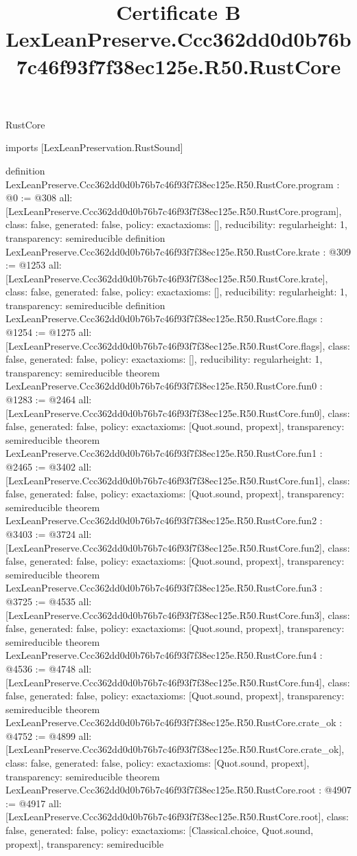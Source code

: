 \begin{lexlean}{RustCore}
\title{Certificate B LexLeanPreserve.Ccc362dd0d0b76b7c46f93f7f38ec125e.R50.RustCore}
\begin{coremodule}
imports [LexLeanPreservation.RustSound]

definition LexLeanPreserve.Ccc362dd0d0b76b7c46f93f7f38ec125e.R50.RustCore.program : @0 := @308 {
  all: [LexLeanPreserve.Ccc362dd0d0b76b7c46f93f7f38ec125e.R50.RustCore.program],
  class: false,
  generated: false,
  policy: exact{axioms: []},
  reducibility: regular{height: 1},
  transparency: semireducible
}
definition LexLeanPreserve.Ccc362dd0d0b76b7c46f93f7f38ec125e.R50.RustCore.krate : @309 := @1253 {
  all: [LexLeanPreserve.Ccc362dd0d0b76b7c46f93f7f38ec125e.R50.RustCore.krate],
  class: false,
  generated: false,
  policy: exact{axioms: []},
  reducibility: regular{height: 1},
  transparency: semireducible
}
definition LexLeanPreserve.Ccc362dd0d0b76b7c46f93f7f38ec125e.R50.RustCore.flags : @1254 := @1275 {
  all: [LexLeanPreserve.Ccc362dd0d0b76b7c46f93f7f38ec125e.R50.RustCore.flags],
  class: false,
  generated: false,
  policy: exact{axioms: []},
  reducibility: regular{height: 1},
  transparency: semireducible
}
theorem LexLeanPreserve.Ccc362dd0d0b76b7c46f93f7f38ec125e.R50.RustCore.fun0 : @1283 := @2464 {
  all: [LexLeanPreserve.Ccc362dd0d0b76b7c46f93f7f38ec125e.R50.RustCore.fun0],
  class: false,
  generated: false,
  policy: exact{axioms: [Quot.sound, propext]},
  transparency: semireducible
}
theorem LexLeanPreserve.Ccc362dd0d0b76b7c46f93f7f38ec125e.R50.RustCore.fun1 : @2465 := @3402 {
  all: [LexLeanPreserve.Ccc362dd0d0b76b7c46f93f7f38ec125e.R50.RustCore.fun1],
  class: false,
  generated: false,
  policy: exact{axioms: [Quot.sound, propext]},
  transparency: semireducible
}
theorem LexLeanPreserve.Ccc362dd0d0b76b7c46f93f7f38ec125e.R50.RustCore.fun2 : @3403 := @3724 {
  all: [LexLeanPreserve.Ccc362dd0d0b76b7c46f93f7f38ec125e.R50.RustCore.fun2],
  class: false,
  generated: false,
  policy: exact{axioms: [Quot.sound, propext]},
  transparency: semireducible
}
theorem LexLeanPreserve.Ccc362dd0d0b76b7c46f93f7f38ec125e.R50.RustCore.fun3 : @3725 := @4535 {
  all: [LexLeanPreserve.Ccc362dd0d0b76b7c46f93f7f38ec125e.R50.RustCore.fun3],
  class: false,
  generated: false,
  policy: exact{axioms: [Quot.sound, propext]},
  transparency: semireducible
}
theorem LexLeanPreserve.Ccc362dd0d0b76b7c46f93f7f38ec125e.R50.RustCore.fun4 : @4536 := @4748 {
  all: [LexLeanPreserve.Ccc362dd0d0b76b7c46f93f7f38ec125e.R50.RustCore.fun4],
  class: false,
  generated: false,
  policy: exact{axioms: [Quot.sound, propext]},
  transparency: semireducible
}
theorem LexLeanPreserve.Ccc362dd0d0b76b7c46f93f7f38ec125e.R50.RustCore.crate_ok : @4752 := @4899 {
  all: [LexLeanPreserve.Ccc362dd0d0b76b7c46f93f7f38ec125e.R50.RustCore.crate_ok],
  class: false,
  generated: false,
  policy: exact{axioms: [Quot.sound, propext]},
  transparency: semireducible
}
theorem LexLeanPreserve.Ccc362dd0d0b76b7c46f93f7f38ec125e.R50.RustCore.root : @4907 := @4917 {
  all: [LexLeanPreserve.Ccc362dd0d0b76b7c46f93f7f38ec125e.R50.RustCore.root],
  class: false,
  generated: false,
  policy: exact{axioms: [Classical.choice, Quot.sound, propext]},
  transparency: semireducible
}


\end{coremodule}
\end{lexlean}
